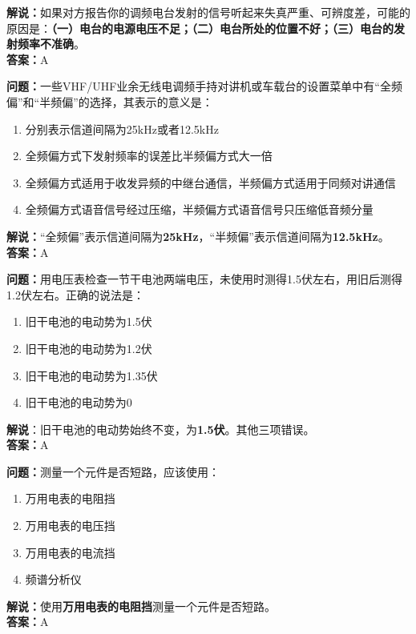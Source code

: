 \textbf{解说：}如果对方报告你的调频电台发射的信号听起来失真严重、可辨度差，可能的原因是：\textbf{（一）电台的电源电压不足；（二）电台所处的位置不好；（三）电台的发射频率不准确}。\\\textbf{答案：}A%


\textbf{问题：}一些VHF/UHF业余无线电调频手持对讲机或车载台的设置菜单中有“全频偏”和“半频偏”的选择，其表示的意义是：

\begin{enumerate}[label=\Alph*), leftmargin=1cm]
	\item 分别表示信道间隔为25kHz或者12.5kHz
	\item 全频偏方式下发射频率的误差比半频偏方式大一倍
	\item 全频偏方式适用于收发异频的中继台通信，半频偏方式适用于同频对讲通信
	\item 全频偏方式语音信号经过压缩，半频偏方式语音信号只压缩低音频分量
\end{enumerate}

\textbf{解说：}“全频偏”表示信道间隔为\textbf{25kHz}，“半频偏”表示信道间隔为\textbf{12.5kHz}。\\\textbf{答案：}A%


\textbf{问题：}用电压表检查一节干电池两端电压，未使用时测得1.5伏左右，用旧后测得1.2伏左右。正确的说法是：

\begin{enumerate}[label=\Alph*), leftmargin=1cm]
	\item 旧干电池的电动势为1.5伏
	\item 旧干电池的电动势为1.2伏
	\item 旧干电池的电动势为1.35伏
	\item 旧干电池的电动势为0
\end{enumerate}

\textbf{解说}：旧干电池的电动势始终不变，为\textbf{1.5伏}。其他三项错误。\\\textbf{答案：}A%


\textbf{问题：}测量一个元件是否短路，应该使用：

\begin{enumerate}[label=\Alph*), leftmargin=1cm]
	\item 万用电表的电阻挡
	\item 万用电表的电压挡
	\item 万用电表的电流挡
	\item 频谱分析仪
\end{enumerate}

\textbf{解说：}使用\textbf{万用电表的电阻挡}测量一个元件是否短路。\\\textbf{答案：}A%


